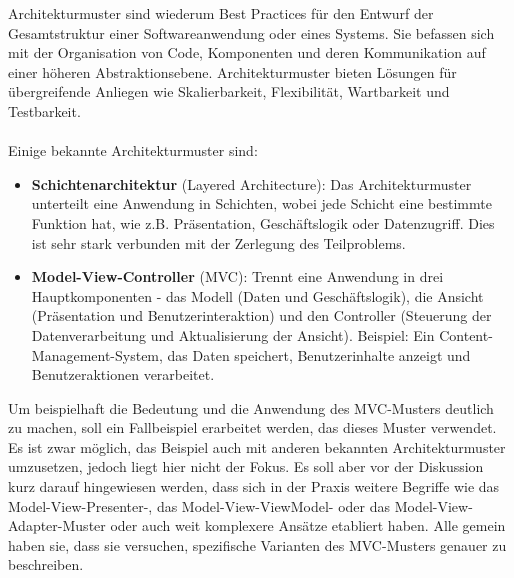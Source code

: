 Architekturmuster sind wiederum Best Practices für den Entwurf der Gesamtstruktur einer Softwareanwendung oder eines Systems. Sie befassen sich mit der Organisation von Code, Komponenten und deren Kommunikation auf einer höheren Abstraktionsebene. Architekturmuster bieten Lösungen für übergreifende Anliegen wie Skalierbarkeit, Flexibilität, Wartbarkeit und Testbarkeit.
\\\\
Einige bekannte Architekturmuster sind:
\begin{itemize}
\item \textbf{Schichtenarchitektur} (Layered Architecture): Das Architekturmuster unterteilt eine Anwendung in Schichten, wobei jede Schicht eine bestimmte Funktion hat, wie z.B. Präsentation, Geschäftslogik oder Datenzugriff. Dies ist sehr stark verbunden mit der Zerlegung des Teilproblems.
\item \textbf{Model-View-Controller} (MVC): Trennt eine Anwendung in drei Hauptkomponenten - das Modell (Daten und Geschäftslogik), die Ansicht (Präsentation und Benutzerinteraktion) und den Controller (Steuerung der Datenverarbeitung und Aktualisierung der Ansicht). Beispiel: Ein Content-Management-System, das Daten speichert, Benutzerinhalte anzeigt und Benutzeraktionen verarbeitet.
\end{itemize}
Um beispielhaft die Bedeutung und die Anwendung des MVC-Musters deutlich zu machen, soll ein Fallbeispiel erarbeitet werden, das dieses Muster verwendet. Es ist zwar möglich, das Beispiel auch mit anderen bekannten Architekturmuster umzusetzen, jedoch liegt hier nicht der Fokus. Es soll aber vor der Diskussion kurz darauf hingewiesen werden, dass sich in der Praxis  weitere Begriffe wie das Model-View-Presenter-, das Model-View-ViewModel- oder das Model-View-Adapter-Muster oder auch weit komplexere Ansätze etabliert haben. Alle gemein haben sie, dass sie versuchen, spezifische Varianten des MVC-Musters genauer zu beschreiben.


